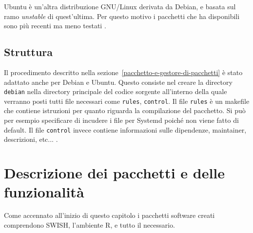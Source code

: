 \documentclass[10pt,titlepage,twoside,a4paper]{report}
\begin{document}
Ubuntu è un'altra distribuzione GNU/Linux derivata da Debian, e basata sul ramo 
\emph{unstable} di quest'ultima. Per questo motivo i pacchetti che ha 
disponibili sono più recenti ma meno testati \cite{ubuntu}.

\subsection{Struttura}
Il procedimento descritto nella sezione~\ref{pacchetto-e-gestore-di-pacchetti}
è stato adattato anche per Debian e Ubuntu. Questo consiste nel creare la 
directory \texttt{debian} nella directory principale del codice sorgente 
all'interno della quale verranno posti tutti file necessari come 
\texttt{rules}, \texttt{control}.  Il file \texttt{rules} è un makefile che 
contiene istruzioni per quanto riguarda la compilazione del pacchetto. Si può 
per esempio specificare di incudere i file per Systemd poiché non viene fatto 
di default. Il file \texttt{control} invece contiene informazioni sulle 
dipendenze, maintainer, descrizioni, etc... \cite{debianPackaging}.


\section{Descrizione dei pacchetti e delle funzionalità}
Come accennato all'inizio di questo capitolo i pacchetti software creati 
comprendono SWISH, l'ambiente R, e tutto il necessario.
\end{document}
